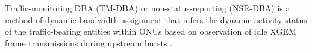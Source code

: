 Traffic-monitoring \ac{DBA} (TM-\ac{DBA}) or non-status-reporting (NSR-\ac{DBA}) is a method of dynamic bandwidth assignment that infers the dynamic activity status of the traffic-bearing entities within \acp{ONU} based on observation of idle \ac{XGEM} frame transmissions during upstream bursts \cite{itu989}. 





